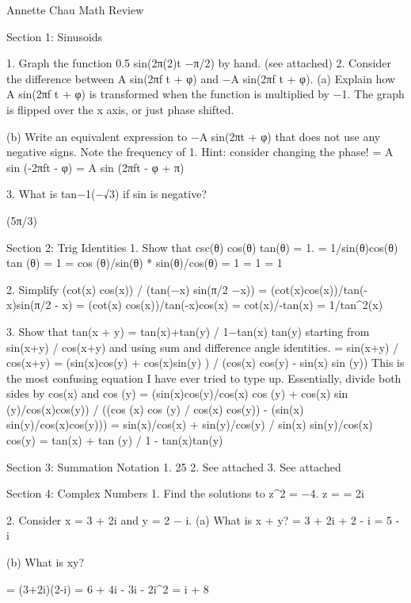Annette Chau
Math Review

Section 1: Sinusoids 

1. Graph the function 0.5 sin(2π(2)t −π/2) by hand. (see attached)
2. Consider the difference between A sin(2πf t + φ) and −A sin(2πf t + φ).
(a) Explain how A sin(2πf t + φ) is transformed when the function is multiplied by −1.
	The graph is flipped over the x axis, or just phase shifted.
	
(b) Write an equivalent expression to −A sin(2πt + φ) that does not use any negative signs. Note the
frequency of 1. Hint: consider changing the phase!
	= A sin (-2πft - φ)
	= A sin (2πft - φ + π)

3. What is tan−1(−√3) if sin is negative?

(5π/3)

Section 2: Trig Identities
1. Show that csc(θ) cos(θ) tan(θ) = 1.
	= 1/sin(θ)cos(θ) tan (θ) = 1
	= cos (θ)/sin(θ) * sin(θ)/cos(θ) = 1
	= 1 = 1

2. Simplify (cot(x) cos(x)) / (tan(−x) sin(π/2 −x))
	= (cot(x)cos(x))/tan(-x)sin(π/2 - x)
	= (cot(x) cos(x))/tan(-x)cos(x)
	= cot(x)/-tan(x)
	= 1/tan^2(x)
	
3. Show that tan(x + y) = tan(x)+tan(y) / 1−tan(x) tan(y) starting from sin(x+y) / cos(x+y) and using sum and difference angle identities.
	= sin(x+y) / cos(x+y) = (sin(x)cos(y) + cos(x)sin(y) ) / (cos(x) cos(y) - sin(x) sin (y))
	This is the most confusing equation I have ever tried to type up. Essentially, divide both sides by cos(x) and cos (y)
	= (sin(x)cos(y)/cos(x) cos (y) + cos(x) sin (y)/cos(x)cos(y)) / ((cos (x) cos (y) / cos(x) cos(y)) - (sin(x) sin(y)/cos(x)cos(y)))
	= sin(x)/cos(x) + sin(y)/cos(y) / sin(x) sin(y)/cos(x) cos(y)
	= tan(x) + tan (y) / 1 - tan(x)tan(y)
	
Section 3: Summation Notation
1. 25
2. See attached
3. See attached

Section 4: Complex Numbers
1. Find the solutions to z^2 = −4.
	z =  = 2i
	
2. Consider x = 3 + 2i and y = 2 − i.
(a) What is x + y?
	= 3 + 2i + 2 - i
	= 5 - i
	
(b) What is xy?

	= (3+2i)(2-i)
	= 6 + 4i - 3i - 2i^2
	= i + 8
